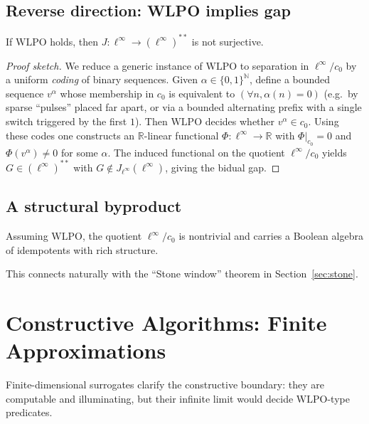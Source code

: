 \documentclass[11pt]{article}
\newcommand{\linf}{\ell^\infty}
\newcommand{\cnull}{c_0}
\newcommand{\WLPO}{\mathrm{WLPO}}
\begin{document}
\subsection{Reverse direction: WLPO implies gap}

\begin{thm}[$\WLPO$ implies Gap]
If $\WLPO$ holds, then $J:\linf\to(\linf)^{**}$ is not surjective.
\end{thm}

\begin{proof}[Proof sketch]
We reduce a generic instance of $\WLPO$ to separation in $\ell^\infty/c_0$ by a
uniform \emph{coding} of binary sequences. Given $\alpha\in\{0,1\}^{\mathbb N}$,
define a bounded sequence $v^\alpha$ whose membership in $c_0$ is equivalent to
$(\forall n,\alpha(n)=0)$ (e.g.\ by sparse ``pulses'' placed far apart, or via a
bounded alternating prefix with a single switch triggered by the first $1$).
Then $\WLPO$ decides whether $v^\alpha\in c_0$. Using these codes one constructs
an $\mathbb R$-linear functional $\Phi:\ell^\infty\to\mathbb R$ with $\Phi|_{c_0}=0$
and $\Phi(v^\alpha)\neq 0$ for some $\alpha$. The induced functional on the
quotient $\ell^\infty/c_0$ yields $G\in(\ell^\infty)^{**}$ with
$G\not\in J_{\ell^\infty}(\ell^\infty)$, giving the bidual gap.
\end{proof}

\subsection{A structural byproduct}

\begin{thm}
Assuming $\WLPO$, the quotient $\linf/\cnull$ is nontrivial and carries a Boolean algebra of idempotents with rich structure.
\end{thm}

This connects naturally with the ``Stone window'' theorem in Section~\ref{sec:stone}.

\section{Constructive Algorithms: Finite Approximations}

Finite-dimensional surrogates clarify the constructive boundary: they are computable and illuminating, but their infinite limit would decide $\WLPO$-type predicates.
\end{document}
